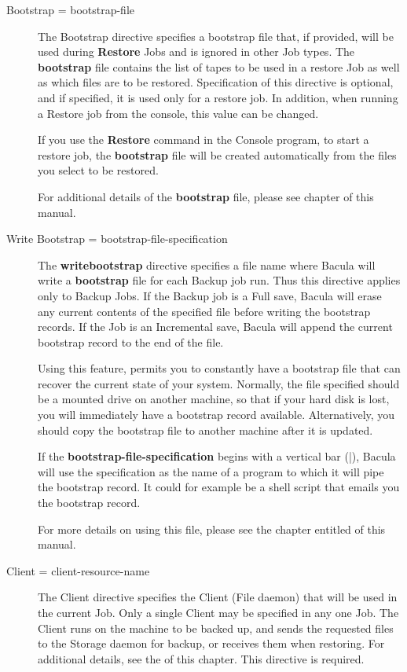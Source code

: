 \begin{description}
\item [Bootstrap = \lt{}bootstrap-file\gt{}]
   The Bootstrap  directive specifies a bootstrap file that, if provided, will 
be used during {\bf Restore} Jobs and is ignored in other  Job types. The {\bf
bootstrap}  file contains the list of tapes to be used in a restore  Job as
well as which files are to be restored. Specification  of this directive is
optional, and  if specified, it is used only for a restore job. In addition, 
when running a Restore job from the console, this value can  be changed.  

If you use the {\bf Restore} command in the Console program,  to start a
restore job, the {\bf bootstrap}  file will be created automatically from the
files you  select to be restored.  

For additional details of the {\bf bootstrap} file, please see  
chapter of this manual. 

\label{writebootstrap}
\item [Write Bootstrap =  \lt{}bootstrap-file-specification\gt{}]
   The  {\bf writebootstrap} directive specifies a file name where  Bacula will
write a {\bf bootstrap} file for each Backup job  run. Thus this directive
applies only to Backup Jobs. If the Backup  job is a Full save, Bacula will
erase any current contents of  the specified file before writing the bootstrap
records. If the Job  is an Incremental save, Bacula will append the current 
bootstrap record to the end of the file.  

Using this feature,  permits you to constantly have a bootstrap file that can
recover the  current state of your system. Normally, the file specified should
be a mounted drive on another machine, so that if your hard disk is  lost,
you will immediately have a bootstrap record available.  Alternatively, you
should copy the bootstrap file to another machine  after it is updated.  

If the {\bf bootstrap-file-specification} begins with a  vertical bar (|),
Bacula will use the specification as the  name of a program to which it will
pipe the bootstrap record.  It could for example be a shell script that emails
you the  bootstrap record. 

For more details on using this file,  please see the chapter entitled 
 of this manual. 

\item [Client = \lt{}client-resource-name\gt{}]
   The Client directive  specifies the Client (File daemon) that will be used in
   the  current Job. Only a single Client may be specified in any one Job.  The
   Client runs on the machine to be backed up,  and sends the requested files to
   the Storage daemon for backup,  or receives them when restoring. For
   additional details, see the  
    of this chapter.
   This directive is required. 


\end{description}
